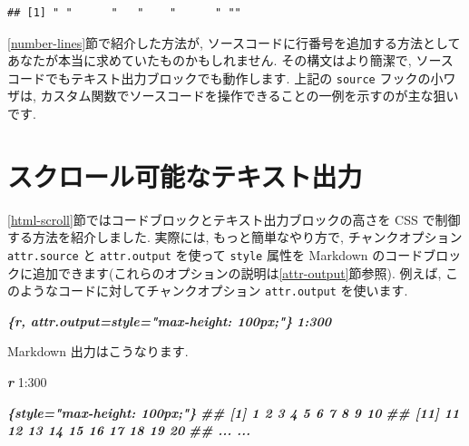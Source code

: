 \documentclass[
  11pt,
  lualatex,ja=standard,jafont=noto]{bxjsreport}
\newenvironment{Shaded}{\begin{snugshade}}{\end{snugshade}}
\newcommand{\DecValTok}[1]{\textcolor[rgb]{0.00,0.00,0.81}{#1}}
\newcommand{\InformationTok}[1]{\textcolor[rgb]{0.56,0.35,0.01}{\textbf{\textit{#1}}}}
\newcommand{\SpecialCharTok}[1]{\textcolor[rgb]{0.00,0.00,0.00}{#1}}
\begin{document}
\begin{verbatim}
## [1] " "      "   "    "      " ""
\end{verbatim}

\ref{number-lines}節で紹介した方法が, ソースコードに行番号を追加する方法としてあなたが本当に求めていたものかもしれません. その構文はより簡潔で, ソースコードでもテキスト出力ブロックでも動作します. 上記の \texttt{source} フックの小ワザは, カスタム関数でソースコードを操作できることの一例を示すのが主な狙いです.

\hypertarget{hook-scroll}{%
\section{スクロール可能なテキスト出力}\label{hook-scroll}}

\ref{html-scroll}節ではコードブロックとテキスト出力ブロックの高さを CSS で制御する方法を紹介しました. 実際には, もっと簡単なやり方で, チャンクオプション \texttt{attr.source} と \texttt{attr.output} を使って \texttt{style} 属性を Markdown のコードブロックに追加できます(これらのオプションの説明は\ref{attr-output}節参照). 例えば, このようなコードに対してチャンクオプション \texttt{attr.output} を使います.

\begin{Shaded}
\begin{Highlighting}[]
\InformationTok{\textasciigrave{}\textasciigrave{}\textasciigrave{}\{r, attr.output=\textquotesingle{}style="max{-}height: 100px;"\textquotesingle{}\}}
\InformationTok{1:300}
\InformationTok{\textasciigrave{}\textasciigrave{}\textasciigrave{}}
\end{Highlighting}
\end{Shaded}

Markdown 出力はこうなります.

\begin{Shaded}
\begin{Highlighting}[]
\InformationTok{\textasciigrave{}\textasciigrave{}\textasciigrave{}r}
\DecValTok{1}\SpecialCharTok{:}\DecValTok{300}
\InformationTok{\textasciigrave{}\textasciigrave{}\textasciigrave{}}

\InformationTok{\textasciigrave{}\textasciigrave{}\textasciigrave{}\{style="max{-}height: 100px;"\}}
\InformationTok{\#\#   [1]   1   2   3   4   5   6   7   8   9  10}
\InformationTok{\#\#  [11]  11  12  13  14  15  16  17  18  19  20}
\InformationTok{\#\#  ... ...}
\InformationTok{\textasciigrave{}\textasciigrave{}\textasciigrave{}}
\end{Highlighting}
\end{Shaded}
\end{document}
